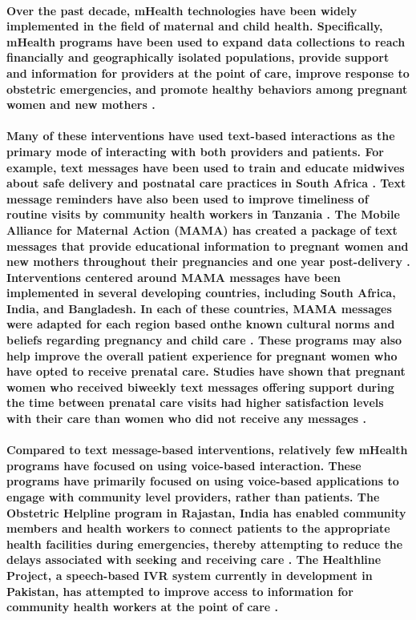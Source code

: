 \paragraph{Over the past decade, mHealth technologies have been widely implemented in the field of maternal and child health. Specifically, mHealth programs have been used to expand data collections to reach financially and geographically isolated populations, provide support and information for providers at the point of care, improve response to obstetric emergencies, and promote healthy behaviors among pregnant women and new mothers \citep{Tamrat2012}.}

\paragraph{Many of these interventions have used text-based interactions as the primary mode of interacting with both providers and patients. For example, text messages have been used to train and educate midwives about safe delivery and postnatal care practices in South Africa \citep{Woods2012}. Text message reminders have also been used to improve timeliness of routine visits by community health workers in Tanzania \citep{DeRenzi2012}. The Mobile Alliance for Maternal Action (MAMA) has created a package of text messages that provide educational information to pregnant women and new mothers throughout their pregnancies and one year post-delivery \citep{MAMA}. Interventions centered around MAMA messages have been implemented in several developing countries, including South Africa, India, and Bangladesh. In each of these countries, MAMA messages were adapted for each region based onthe known cultural norms and beliefs regarding pregnancy and child care \citep{McCartney2012}. These programs may also help improve the overall patient experience for pregnant women who have opted to receive prenatal care. Studies have shown that pregnant women who received biweekly text messages offering support during the time between prenatal care visits had higher satisfaction levels with their care than women who did not receive any messages \citep{Jareethum2008}.}

\paragraph{Compared to text message-based interventions, relatively few mHealth programs have focused on using voice-based interaction. These programs have primarily focused on using voice-based applications to engage with community level providers, rather than patients. The Obstetric Helpline program in Rajastan, India has enabled community members and health workers to connect patients to the appropriate health facilities during emergencies, thereby attempting to reduce the delays associated with seeking and receiving care \citep{UNICEF2008}.  The Healthline Project, a speech-based IVR system currently in development in Pakistan, has attempted to improve access to information for community health workers at the point of care \citep{Sherwani2007}. }

